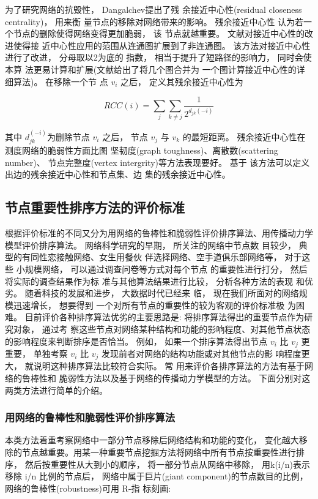 				为了研究网络的抗毁性， Dangalchev\parencite{Dangalchev2006Residual}提出了残 余接近中心性(residual closeness centrality)， 用来衡 量节点的移除对网络带来的影响。 残余接近中心性 认为若一个节点的删除使得网络变得更加脆弱， 该 节点就越重要。 文献\parencite{Dangalchev2006Residual}对接近中心性的改进使得接 近中心性应用的范围从连通图扩展到了非连通图。 该方法对接近中心性进行了改进， 分母取以2为底的 指数， 相当于提升了短路径的影响力， 同时会使本算 法更易计算和扩展(文献\parencite{Dangalchev2006Residual}给出了将几个图合并为 一个图计算接近中心性的详细算法)。 在移除一个节 点 $v_i$ 之后， 定义其残余接近中心性为

				$$RCC(i)=\sum\limits_j {\sum\limits_{k\ne j} {\frac{1}{2^{d_{jk}(-i)}}}} $$

				其中 $d_{jk}^{(-i)}$为删除节点 $v_i$ 之后， 节点 $v_j$ 与 $v_k$ 的最短距离。 残余接近中心性在测度网络的脆弱性方面比图 坚韧度(graph toughness)、离散数(scattering number)、 节点完整度(vertex intergrity)等方法表现要好。 基于 该方法可以定义出边的残余接近中心性和节点集、边 集的残余接近中心性。

	\subsection{节点重要性排序方法的评价标准}
	根据评价标准的不同又分为用网络的鲁棒性和脆弱性评价排序算法、用传播动力学模型评价排序算法。
			网络科学研究的早期， 所关注的网络中节点数 目较少， 典型的有同性恋接触网络\parencite{Ide2015Risk,lpx2004wl}、女生用餐伙 伴选择网络\parencite{Moreno1961The}、空手道俱乐部网络\parencite{Stephenson1989Rethinking}等， 对于这些 小规模网络， 可以通过调查问卷等方式对每个节点 的重要性进行打分， 然后将实际的调查结果作为标 准与其他算法结果进行比较， 分析各种方法的表现 和优劣。 随着科技的发展和进步， 大数据时代已经来 临， 现在我们所面对的网络规模迅速增长， 想要得到 一个对所有节点的重要性的较为客观的评价标准极 为困难。 目前评价各种排序算法优劣的主要思路是: 将排序算法得出的重要节点作为研究对象， 通过考 察这些节点对网络某种结构和功能的影响程度、对其他节点状态的影响程度来判断排序是否恰当。 例如， 如果一个排序算法得出节点 $v_i$ 比 $v_j$ 更重要， 单独考察 $v_i$ 比 $v_j$ 发现前者对网络的结构功能或对其他节点的影 响程度更大， 就说明这种排序算法比较符合实际。 常 用来评价各排序算法的方法有基于网络的鲁棒性和 脆弱性方法以及基于网络的传播动力学模型的方法。 下面分别对这两类方法进行简单的介绍。
	\subsubsection{用网络的鲁棒性和脆弱性评价排序算法}
	本类方法着重考察网络中一部分节点移除后网络结构和功能的变化， 变化越大移除的节点越重要。用某一种重要节点挖掘方法将网络中所有节点按重要性进行排序， 然后按重要性从大到小的顺序， 将一部分节点从网络中移除， 用k(i/n)表示移除 i/n 比例的节点后， 网络中属于巨片(giant component)\parencite{Dereich2013Random}的节点数目的比例， 网络的鲁棒性(robustness)可用 R-指 标刻画\parencite{Schneider2011Mitigation}:

